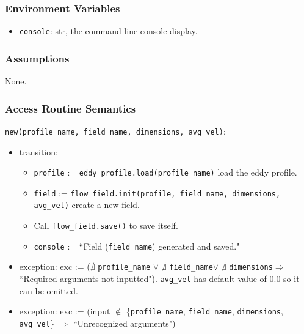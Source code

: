 \documentclass[12pt, titlepage]{article}
\begin{document}
\subsubsection{Environment Variables}
\begin{itemize}
  \item \texttt{console}: str, the command line console display.
\end{itemize}

\subsubsection{Assumptions}
None.

\subsubsection{Access Routine Semantics}

\noindent \texttt{new(profile\_name, field\_name, dimensions, avg\_vel)}:
\begin{itemize}
  \item transition:
  \begin{itemize}
    \item \texttt{profile} := \texttt{eddy\_profile.load(profile\_name)} load the eddy profile.
    \item \texttt{field} := \texttt{flow\_field.init(profile, field\_name, dimensions, avg\_vel)} create a new field.
    \item Call \texttt{flow\_field.save()} to save itself.
    \item \texttt{console} := ``Field (\texttt{field\_name}) generated and saved."
  \end{itemize}
  \item exception: exc := ($\nexists$ \texttt{profile\_name} $\vee$ $\nexists$ \texttt{field\_name}$\vee$ $\nexists$ \texttt{dimensions}$\Rightarrow$ ``Required arguments not inputted"). \texttt{avg\_vel} has default value of 0.0 so it can be omitted.
  \item exception: exc := (input $\notin$ \{\texttt{profile\_name}, \texttt{field\_name}, \texttt{dimensions}, \texttt{avg\_vel}\} $\Rightarrow$ ``Unrecognized arguments")
\end{itemize}
\end{document}
